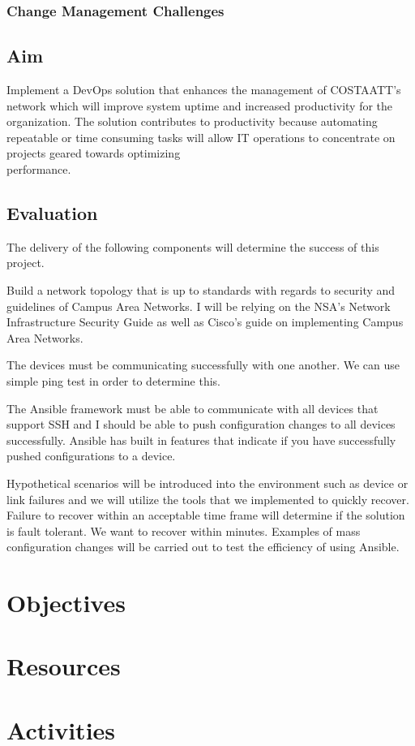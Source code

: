 \documentclass[12pt, letterpaper]{article}
\begin{document}
	\subsubsection{Change Management Challenges}


\newpage

	\subsection{Aim}
Implement a DevOps solution that enhances the management of COSTAATT's network which will improve system uptime and increased productivity for the organization. The solution contributes to productivity because automating repeatable or time consuming tasks will allow IT operations to concentrate on projects geared towards optimizing \\
performance.

\medskip



	\subsection{Evaluation}
The delivery of the following components will determine the success of this project.

\medskip

Build a network topology that is up to standards with regards to security and guidelines of Campus Area Networks. I will be relying on the NSA’s Network Infrastructure Security Guide as well as Cisco’s guide on implementing Campus Area Networks. 

\medskip

The devices must be communicating successfully with one another. We can use simple ping test in order to determine this. 

\medskip

The Ansible framework must be able to communicate with all devices that support SSH and I should be able to push configuration changes to all devices successfully. Ansible has built in features that indicate if you have successfully pushed configurations to a device. 

\medskip

Hypothetical scenarios will be introduced into the environment such as device or link failures and we will utilize the tools that we implemented to quickly recover. Failure to recover within an acceptable time frame will determine if the solution is fault tolerant. We want to recover within minutes. Examples of mass configuration changes will be carried out to test the efficiency of using Ansible. 


\newpage

\section{Objectives}

\newpage

\section{Resources}

\newpage

\section{Activities}
\end{document}
